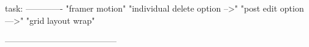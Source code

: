task:
-------------
"framer motion"
"individual delete option -->"
"post edit option --->"
"grid layout wrap"

---------------------------------------

